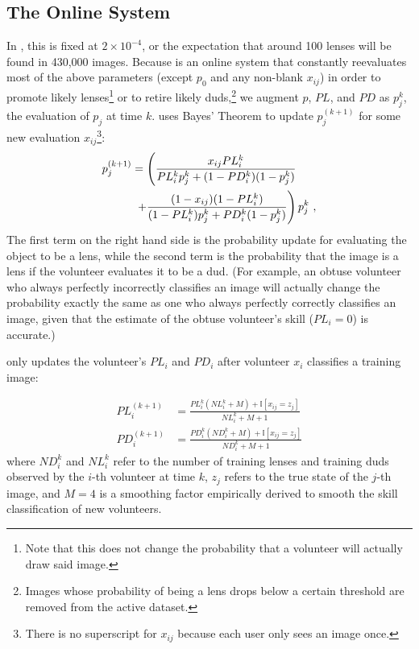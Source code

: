 \documentclass[useAMS,usenatbib,a4paper]{mn2e}
\begin{document}

\subsection{The Online System}
\label{sec:formalism:online}
In \sw, this is fixed at $2 \times 10^{-4}$, or the expectation that
around 100 lenses will be found in 430,000 images. Because \sw is an online
system that constantly reevaluates most of the above parameters (except $p_0$
and any non-blank $x_{ij}$) in order to promote likely lenses\footnote{Note
that this does not change the probability that a volunteer will actually draw
said image.} or to retire likely duds,\footnote{Images whose probability of
being a lens drops below a certain threshold are removed from the active
dataset.} we augment $p$, $PL$, and $PD$ as $p_j^k$, the evaluation of
$p_j$ at time $k$. \sw uses Bayes' Theorem to update $p_j^{(k + 1)}$ for
some new evaluation $x_{ij}$\footnote{There is no superscript for $x_{ij}$
because each user only sees an image once.}:
\begin{align}
  p_j^{(k + 1)} &= \left ( \frac{x_{ij} PL_{i}^{k}
  }{PL_{i}^{k} p_j^k + (1 - PD_{i}^{k})(1 -
  p_j^k)}
  \right. \notag \\ & \; \left . +
  \frac{(1 - x_{ij}) (1 - PL_{i}^{k})
  }{(1 - PL_{i}^{k}) p_j^k + PD_{i}^{k}(1 -
  p_j^k)} \right ) p_j^k \ ,
\end{align}
The first term on the right hand side is the probability update for evaluating
the object to be a lens, while the second term is the probability that the
image is a lens if the volunteer evaluates it to be a dud.  (For example, an
obtuse volunteer who always perfectly incorrectly classifies an image will
actually change the probability exactly the same as one who always perfectly
correctly classifies an image, given that the estimate of the obtuse
volunteer's skill ($PL_{i} = 0$) is accurate.)

\sw only updates the volunteer's $PL_{i}$ and $PD_{i}$ after volunteer $x_i$
classifies a training image:

\begin{align}
  PL_{i}^{(k + 1)} &= \frac{PL_{i}^{k} (NL_{i}^{k} + M) + \mathbb{I}[x_{ij} =
  z_{j}]}{NL_{i}^{k} + M + 1} \\
  PD_{i}^{(k + 1)} &= \frac{PD_{i}^{k} (ND_{i}^{k} + M) + \mathbb{I}[x_{ij} =
  z_{j}]}{ND_{i}^{k} + M + 1}
\end{align}
where $ND_{i}^{k}$ and $NL_{i}^{k}$ refer to the number of training lenses and
training duds observed by the $i$-th volunteer at time $k$, $z_{j}$ refers
to the true state of the $j$-th image, and $M = 4$ is a smoothing factor
empirically derived to smooth the skill classification of new volunteers.
\end{document}
